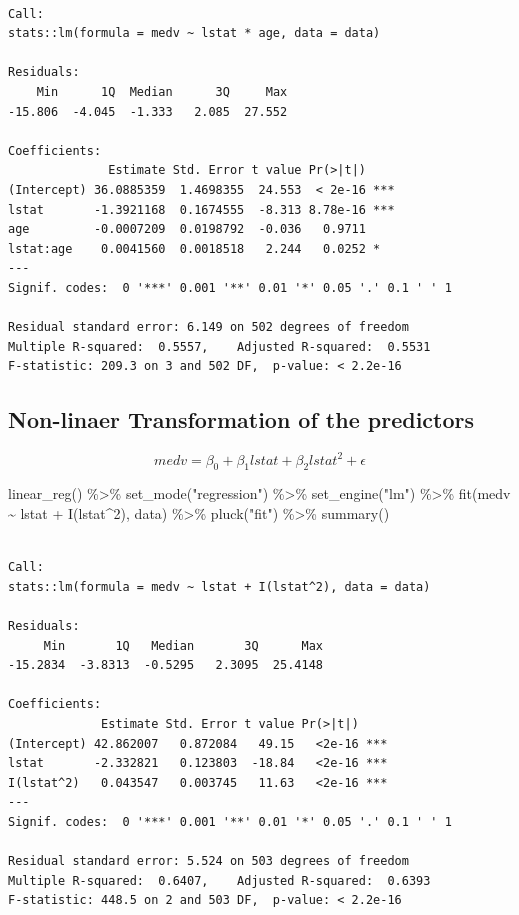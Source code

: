 \documentclass[
  letterpaper,
  DIV=11,
  numbers=noendperiod]{scrreprt}
\newenvironment{Shaded}{\begin{snugshade}}{\end{snugshade}}
\newcommand{\DecValTok}[1]{\textcolor[rgb]{0.47,0.16,0.63}{#1}}
\newcommand{\FunctionTok}[1]{\textcolor[rgb]{0.02,0.16,0.49}{#1}}
\newcommand{\NormalTok}[1]{\textcolor[rgb]{0.33,0.33,0.33}{#1}}
\newcommand{\SpecialCharTok}[1]{\textcolor[rgb]{0.00,0.46,0.62}{#1}}
\newcommand{\StringTok}[1]{\textcolor[rgb]{0.00,0.50,0.00}{#1}}
\begin{document}
\begin{verbatim}

Call:
stats::lm(formula = medv ~ lstat * age, data = data)

Residuals:
    Min      1Q  Median      3Q     Max 
-15.806  -4.045  -1.333   2.085  27.552 

Coefficients:
              Estimate Std. Error t value Pr(>|t|)    
(Intercept) 36.0885359  1.4698355  24.553  < 2e-16 ***
lstat       -1.3921168  0.1674555  -8.313 8.78e-16 ***
age         -0.0007209  0.0198792  -0.036   0.9711    
lstat:age    0.0041560  0.0018518   2.244   0.0252 *  
---
Signif. codes:  0 '***' 0.001 '**' 0.01 '*' 0.05 '.' 0.1 ' ' 1

Residual standard error: 6.149 on 502 degrees of freedom
Multiple R-squared:  0.5557,    Adjusted R-squared:  0.5531 
F-statistic: 209.3 on 3 and 502 DF,  p-value: < 2.2e-16
\end{verbatim}

\hypertarget{non-linaer-transformation-of-the-predictors}{%
\subsection{Non-linaer Transformation of the
predictors}\label{non-linaer-transformation-of-the-predictors}}

\[
medv = \beta_0 + \beta_1 lstat + \beta_2 lstat^2 + \epsilon
\]

\begin{Shaded}
\begin{Highlighting}[]
\FunctionTok{linear\_reg}\NormalTok{() }\SpecialCharTok{\%\textgreater{}\%} 
  \FunctionTok{set\_mode}\NormalTok{(}\StringTok{"regression"}\NormalTok{) }\SpecialCharTok{\%\textgreater{}\%} 
  \FunctionTok{set\_engine}\NormalTok{(}\StringTok{"lm"}\NormalTok{) }\SpecialCharTok{\%\textgreater{}\%} 
  \FunctionTok{fit}\NormalTok{(medv }\SpecialCharTok{\textasciitilde{}}\NormalTok{ lstat }\SpecialCharTok{+} \FunctionTok{I}\NormalTok{(lstat}\SpecialCharTok{\^{}}\DecValTok{2}\NormalTok{), data) }\SpecialCharTok{\%\textgreater{}\%} 
  \FunctionTok{pluck}\NormalTok{(}\StringTok{"fit"}\NormalTok{) }\SpecialCharTok{\%\textgreater{}\%} 
  \FunctionTok{summary}\NormalTok{()}
\end{Highlighting}
\end{Shaded}

\begin{verbatim}

Call:
stats::lm(formula = medv ~ lstat + I(lstat^2), data = data)

Residuals:
     Min       1Q   Median       3Q      Max 
-15.2834  -3.8313  -0.5295   2.3095  25.4148 

Coefficients:
             Estimate Std. Error t value Pr(>|t|)    
(Intercept) 42.862007   0.872084   49.15   <2e-16 ***
lstat       -2.332821   0.123803  -18.84   <2e-16 ***
I(lstat^2)   0.043547   0.003745   11.63   <2e-16 ***
---
Signif. codes:  0 '***' 0.001 '**' 0.01 '*' 0.05 '.' 0.1 ' ' 1

Residual standard error: 5.524 on 503 degrees of freedom
Multiple R-squared:  0.6407,    Adjusted R-squared:  0.6393 
F-statistic: 448.5 on 2 and 503 DF,  p-value: < 2.2e-16
\end{verbatim}
\end{document}
